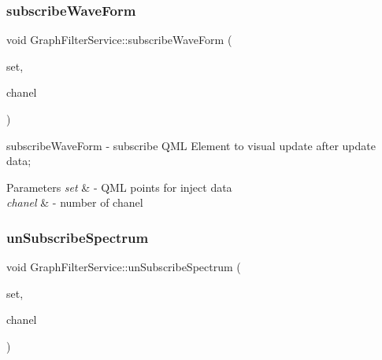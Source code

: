 \hypertarget{class_graph_filter_service_af02cad074674e6ff8030c2e8fc3be111}{}\label{class_graph_filter_service_af02cad074674e6ff8030c2e8fc3be111} 
\subsubsection{\texorpdfstring{subscribe\+Wave\+Form}{subscribeWaveForm}}
{\footnotesize\ttfamily void Graph\+Filter\+Service\+::subscribe\+Wave\+Form (\begin{DoxyParamCaption}\item[{Q\+X\+Y\+Series $\ast$}]{set,  }\item[{int}]{chanel }\end{DoxyParamCaption})\hspace{0.3cm}{\ttfamily [slot]}}



subscribe\+Wave\+Form -\/ subscribe Q\+ML Element to visual update after update data; 


\begin{DoxyParams}{Parameters}
{\em set} & -\/ Q\+ML points for inject data \\
\hline
{\em chanel} & -\/ number of chanel \\
\hline
\end{DoxyParams}
\hypertarget{class_graph_filter_service_aae672b63fafe0403b7ae68844bbf90fa}{}\label{class_graph_filter_service_aae672b63fafe0403b7ae68844bbf90fa} 
\subsubsection{\texorpdfstring{un\+Subscribe\+Spectrum}{unSubscribeSpectrum}}
{\footnotesize\ttfamily void Graph\+Filter\+Service\+::un\+Subscribe\+Spectrum (\begin{DoxyParamCaption}\item[{Q\+X\+Y\+Series $\ast$}]{set,  }\item[{int}]{chanel }\end{DoxyParamCaption})\hspace{0.3cm}{\ttfamily [slot]}}

\hypertarget{class_graph_filter_service_a710cfa42186e53b0ffbe9f34d57184a7}{}\label{class_graph_filter_service_a710cfa42186e53b0ffbe9f34d57184a7} 
